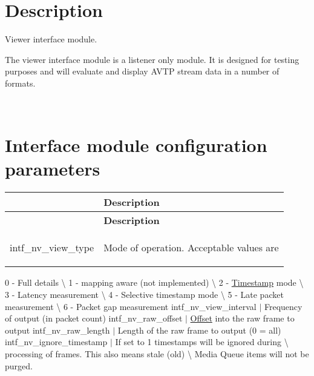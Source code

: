 \section*{Description}

Viewer interface module.

The viewer interface module is a listener only module. It is designed for testing purposes and will evaluate and display A\+V\+TP stream data in a number of formats.

~\newline
 \section*{Interface module configuration parameters}

\tabulinesep=1mm
\begin{longtabu} spread 0pt [c]{*2{|X[-1]}|}
\hline
{}&{\bf Description  }\\
\endfirsthead
\hline
\endfoot
\hline
{}&{\bf Description  }\\
\endhead
intf\+\_\+nv\+\_\+view\+\_\+type &Mode of operation. Acceptable values are
\begin{DoxyItemize}
\item 
\end{DoxyItemize}\\
\end{longtabu}
0 -\/ Full details \textbackslash{} 1 -\/ mapping aware (not implemented) \textbackslash{} 2 -\/ \hyperlink{class_timestamp}{Timestamp} mode \textbackslash{} 3 -\/ Latency measurement \textbackslash{} 4 -\/ Selective timestamp mode \textbackslash{} 5 -\/ Late packet measurement \textbackslash{} 6 -\/ Packet gap measurement intf\+\_\+nv\+\_\+view\+\_\+interval $\vert$ Frequency of output (in packet count) intf\+\_\+nv\+\_\+raw\+\_\+offset $\vert$ \hyperlink{class_offset}{Offset} into the raw frame to output intf\+\_\+nv\+\_\+raw\+\_\+length $\vert$ Length of the raw frame to output (0 = all) intf\+\_\+nv\+\_\+ignore\+\_\+timestamp $\vert$ If set to 1 timestamps will be ignored during \textbackslash{} processing of frames. This also means stale (old) \textbackslash{} Media Queue items will not be purged. 